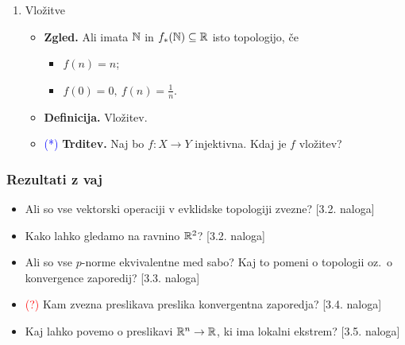 \begin{enumerate}
    \item Vložitve
    \begin{itemize}
        \item \textbf{Zgled.} Ali imata \(\mathbb{N}\) in \(f_{*}(\mathbb{N}) \subseteq \mathbb{R}\) isto topologijo, če
        \begin{itemize}
            \item \(f(n) = n\);
            \item \(f(0) = 0,\ f(n) = \frac{1}{n}\).
        \end{itemize}
        \item \textbf{Definicija.} Vložitev.
        \item \textcolor{blue}{(*)} \textbf{Trditev.} Naj bo \(f: X \to Y\) injektivna. Kdaj je \(f\) vložitev?
    \end{itemize}
\end{enumerate}

\subsubsection*{Rezultati z vaj}
\begin{itemize}
    \item Ali so vse vektorski operaciji v evklidske topologiji zvezne? [3.2. naloga]
    \item Kako lahko gledamo na ravnino $\mathbb{R}^2$? [3.2. naloga]
    \item Ali so vse $p$-norme ekvivalentne med sabo? Kaj to pomeni o topologii oz.\ o konvergence zaporedij? [3.3. naloga]
    \item \textcolor{red}{(?)} Kam zvezna preslikava preslika konvergentna zaporedja? [3.4. naloga]
    \item Kaj lahko povemo o preslikavi $\mathbb{R}^n \to \mathbb{R}$, ki ima lokalni ekstrem? [3.5. naloga]
\end{itemize}


